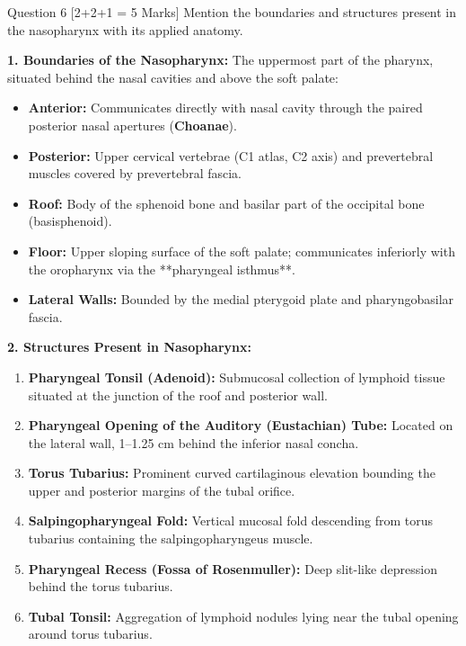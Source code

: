 \documentclass[11pt,a4paper]{article}
\begin{document}
\begin{qbox}{Question 6 [2+2+1 = 5 Marks]}
Mention the boundaries and structures present in the nasopharynx with its applied anatomy.
\end{qbox}

\begin{ansbox}
\textbf{1. Boundaries of the Nasopharynx:}
The uppermost part of the pharynx, situated behind the nasal cavities and above the soft palate:
\begin{itemize}[leftmargin=*]
    \item \textbf{Anterior:} Communicates directly with nasal cavity through the paired posterior nasal apertures (\textbf{Choanae}).
    \item \textbf{Posterior:} Upper cervical vertebrae (C1 atlas, C2 axis) and prevertebral muscles covered by prevertebral fascia.
    \item \textbf{Roof:} Body of the sphenoid bone and basilar part of the occipital bone (basisphenoid).
    \item \textbf{Floor:} Upper sloping surface of the soft palate; communicates inferiorly with the oropharynx via the **pharyngeal isthmus**.
    \item \textbf{Lateral Walls:} Bounded by the medial pterygoid plate and pharyngobasilar fascia.
\end{itemize}

\textbf{2. Structures Present in Nasopharynx:}
\begin{enumerate}[leftmargin=*]
    \item \textbf{Pharyngeal Tonsil (Adenoid):} Submucosal collection of lymphoid tissue situated at the junction of the roof and posterior wall.
    \item \textbf{Pharyngeal Opening of the Auditory (Eustachian) Tube:} Located on the lateral wall, 1--1.25 cm behind the inferior nasal concha.
    \item \textbf{Torus Tubarius:} Prominent curved cartilaginous elevation bounding the upper and posterior margins of the tubal orifice.
    \item \textbf{Salpingopharyngeal Fold:} Vertical mucosal fold descending from torus tubarius containing the salpingopharyngeus muscle.
    \item \textbf{Pharyngeal Recess (Fossa of Rosenmuller):} Deep slit-like depression behind the torus tubarius.
    \item \textbf{Tubal Tonsil:} Aggregation of lymphoid nodules lying near the tubal opening around torus tubarius.
\end{enumerate}


\end{ansbox}
\end{document}
